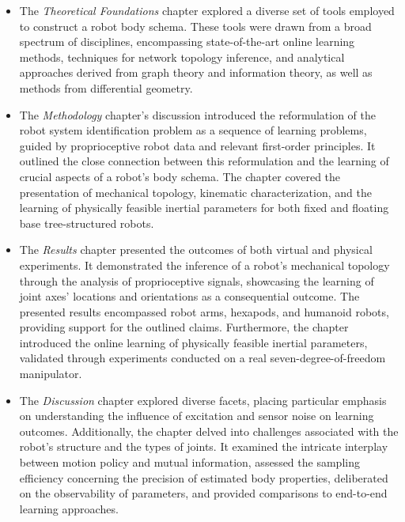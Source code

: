 \documentclass[12pt, a4paper]{article}
\begin{document}
\begin{itemize}
	\item The \textit{Theoretical Foundations} chapter explored a diverse set of tools employed to construct a robot body schema. These tools were drawn from a broad spectrum of disciplines, encompassing state-of-the-art online learning methods, techniques for network topology inference, and analytical approaches derived from graph theory and information theory, as well as methods from differential geometry.
	\item The \textit{Methodology} chapter's discussion introduced the reformulation of the robot system identification problem as a sequence of learning problems, guided by proprioceptive robot data and relevant first-order principles. It outlined the close connection between this reformulation and the learning of crucial aspects of a robot's body schema. The chapter covered the presentation of mechanical topology, kinematic characterization, and the learning of physically feasible inertial parameters for both fixed and floating base tree-structured robots.
	\item The \textit{Results} chapter presented the outcomes of both virtual and physical experiments. It demonstrated the inference of a robot's mechanical topology through the analysis of proprioceptive signals, showcasing the learning of joint axes' locations and orientations as a consequential outcome. The presented results encompassed robot arms, hexapods, and humanoid robots, providing support for the outlined claims. Furthermore, the chapter introduced the online learning of physically feasible inertial parameters, validated through experiments conducted on a real seven-degree-of-freedom manipulator.
	\item The \textit{Discussion} chapter explored diverse facets, placing particular emphasis on understanding the influence of excitation and sensor noise on learning outcomes. Additionally, the chapter delved into challenges associated with the robot's structure and the types of joints. It examined the intricate interplay between motion policy and mutual information, assessed the sampling efficiency concerning the precision of estimated body properties, deliberated on the observability of parameters, and provided comparisons to end-to-end learning approaches.
\end{itemize}
\end{document}
